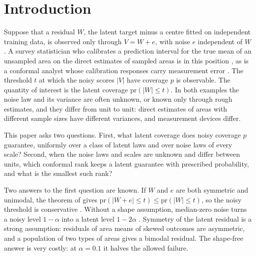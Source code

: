 \documentclass[12pt]{article}
\renewcommand{\theequation}{\thesection\arabic{equation}}
\theoremstyle{definition}
\newcommand{\pr}{\mathrm{pr}}
\begin{document}
\def\thefigure{\arabic{figure}}
\def\thetable{\arabic{table}}
\renewcommand{\theequation}{\thesection.\arabic{equation}}

\fontsize{12}{14pt plus.8pt minus .6pt}\selectfont

\section{Introduction}\label{sec:intro}

Suppose that a residual $W$, the latent target minus a centre fitted on independent training data, is observed only through $V = W + e$, with noise $e$ independent of $W$. A survey statistician who calibrates a prediction interval for the true mean of an unsampled area on the direct estimates of sampled areas is in this position \citep{fay1979}, as is a conformal analyst whose calibration responses carry measurement error \citep{einbinder2024, cohen2025}. The threshold $t$ at which the noisy scores $|V|$ have coverage $p$ is observable. The quantity of interest is the latent coverage $\pr(|W| \le t)$. In both examples the noise law and its variance are often unknown, or known only through rough estimates, and they differ from unit to unit: direct estimates of areas with different sample sizes have different variances, and measurement devices differ.

This paper asks two questions. First, what latent coverage does noisy coverage $p$ guarantee, uniformly over a class of latent laws and over noise laws of every scale? Second, when the noise laws and scales are unknown and differ between units, which conformal rank keeps a latent guarantee with prescribed probability, and what is the smallest such rank?

Two answers to the first question are known. If $W$ and $e$ are both symmetric and unimodal, the theorem of \citet{anderson1955} gives $\pr(|W + e| \le t) \le \pr(|W| \le t)$, so the noisy threshold is conservative \citep{einbinder2024}. Without a shape assumption, median-zero noise turns a noisy level $1 - \alpha$ into a latent level $1 - 2\alpha$ \citep[Proposition~2.3]{guille2024}. Symmetry of the latent residual is a strong assumption: residuals of area means of skewed outcomes are asymmetric, and a population of two types of areas gives a bimodal residual. The shape-free answer is very costly: at $\alpha = 0.1$ it halves the allowed failure.
\end{document}
